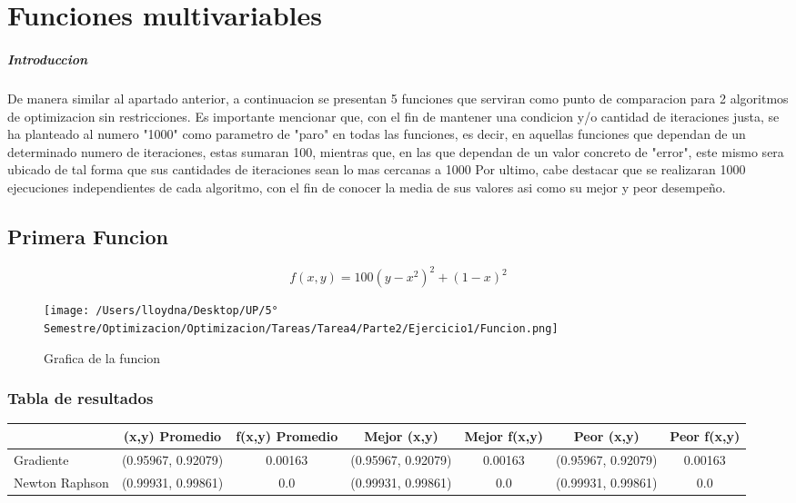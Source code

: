 \documentclass{report}
\begin{document}
    \chapter{Funciones multivariables}
        \paragraph{Introduccion}
        De manera similar al apartado anterior, a continuacion se presentan 5 funciones que serviran como punto de comparacion para 2 algoritmos de optimizacion sin restricciones.
        Es importante mencionar que, con el fin de mantener una condicion y/o cantidad de iteraciones justa, se ha planteado al numero "1000"
        como parametro de "paro" en todas las funciones, es decir, en aquellas funciones que dependan de un determinado numero de iteraciones,
        estas sumaran 100, mientras que, en las que dependan de un valor concreto de "error", este mismo sera ubicado de tal forma que sus cantidades
        de iteraciones sean lo mas cercanas a 1000
        Por ultimo, cabe destacar que se realizaran 1000 ejecuciones independientes de cada algoritmo, con el fin de conocer la media de sus valores
        asi como su mejor y peor desempeño.
        \pagebreak

        \section{Primera Funcion}
            \begin{equation*}
                f(x,y)=100(y-x^2)^2+(1-x)^2
            \end{equation*}

            \begin{figure}[H]
                \texttt{[image: /Users/lloydna/Desktop/UP/5° Semestre/Optimizacion/Optimizacion/Tareas/Tarea4/Parte2/Ejercicio1/Funcion.png]}
                \caption{Grafica de la funcion}
                \label{fig:fun15}
            \end{figure}

            \subsection{Tabla de resultados}
            \begin{tabular}{l|c|c|c|c|c|c}
                & (x,y) Promedio & f(x,y) Promedio & Mejor (x,y) & Mejor f(x,y) & Peor (x,y) & Peor f(x,y)\\
                \hline
                Gradiente & (0.95967, 0.92079) & 0.00163 & (0.95967, 0.92079) & 0.00163 & (0.95967, 0.92079) & 0.00163\\
                \hline
                Newton Raphson & (0.99931, 0.99861) & 0.0 & (0.99931, 0.99861) & 0.0 & (0.99931, 0.99861) & 0.0\\
                \hline
            \end{tabular}
        \pagebreak
\end{document}
